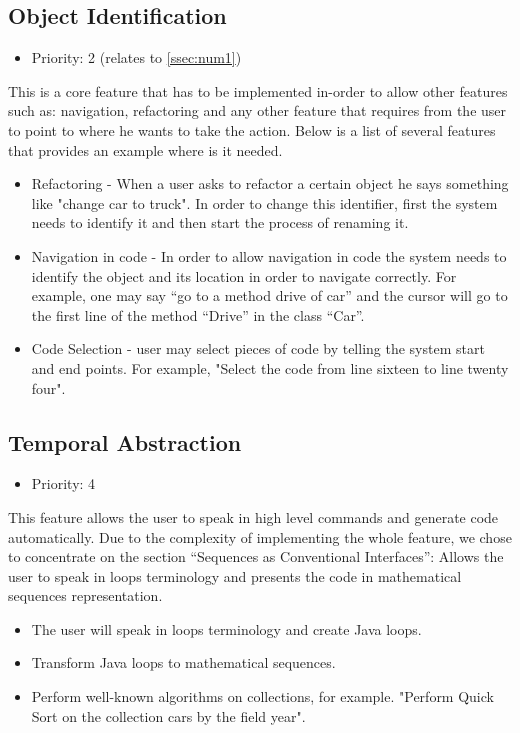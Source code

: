 \subsection{Object Identification}
\begin{itemize}
	\item Priority: 2 (relates to \ref{ssec:num1})
\end{itemize}
This is a core feature that has to be implemented in-order to allow other features such as: navigation, refactoring and any other feature that requires from the user to point to where he wants to take the action. Below is a list of several features that provides an example where is it needed.
\begin{itemize}
	\item Refactoring - When a user asks to refactor a certain object he says something like "change car to truck". In order to change this identifier, first the system needs to identify it and then start the process of renaming it.
	\item Navigation in code - In order to allow navigation in code the system needs to identify the object and its location in order to navigate correctly. For example, one may say “go to a method drive of car” and the cursor will go to the first line of the method “Drive” in the class “Car”.
	\item Code Selection - user may select pieces of code by telling the system start and end points. For example, "Select the code from line sixteen to line twenty four".
\end{itemize}
\subsection{Temporal Abstraction}
\begin{itemize}
	\item Priority: 4
\end{itemize}
This feature allows the user to speak in high level commands and generate code automatically. Due to the complexity of implementing the whole feature, we chose to concentrate on the section “Sequences as Conventional Interfaces”: Allows the user to speak in loops terminology and presents the code in mathematical sequences representation.
\begin{itemize}
	\item The user will speak in loops terminology and create Java loops.
	\item Transform Java loops to mathematical sequences.
	\item Perform well-known algorithms on collections, for example. "Perform Quick Sort on the collection cars by the field year". 
\end{itemize}
